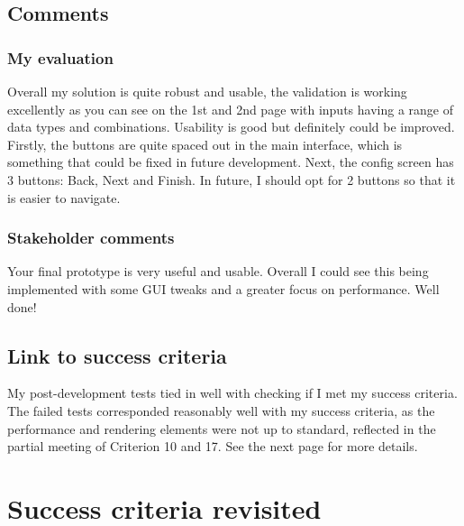 


\subsection{Comments}

\subsubsection{My evaluation}
Overall my solution is quite robust and usable, the validation is working excellently as you can see on the 1st and 2nd page with inputs having a range of data types and combinations. \newline Usability is good but definitely could be improved. Firstly, the buttons are quite spaced out in the main interface, which is something that could be fixed in future development. Next, the config screen has 3 buttons: Back, Next and Finish. In future, I should opt for 2 buttons so that it is easier to navigate.

\subsubsection{Stakeholder comments}

Your final prototype is very useful and usable. Overall I could see this being implemented with some GUI tweaks and a greater focus on performance. Well done!

\subsection{Link to success criteria}

My post-development tests tied in well with checking if I met my success criteria. The failed tests corresponded reasonably well with my success criteria, as the performance and rendering elements were not up to standard, reflected in the partial meeting of Criterion 10 and 17. See the next page for more details.
\newpage

\section{Success criteria revisited}

